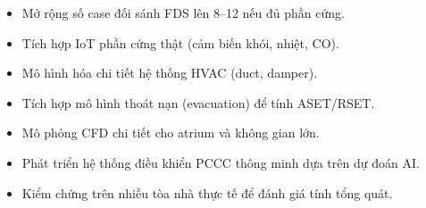 \begin{itemize}
  \item Mở rộng số case đối sánh FDS lên 8--12 nếu đủ phần cứng.
  \item Tích hợp IoT phần cứng thật (cảm biến khói, nhiệt, CO).
  \item Mô hình hóa chi tiết hệ thống HVAC (duct, damper).
  \item Tích hợp mô hình thoát nạn (evacuation) để tính ASET/RSET.
  \item Mô phỏng CFD chi tiết cho atrium và không gian lớn.
  \item Phát triển hệ thống điều khiển PCCC thông minh dựa trên dự đoán AI.
  \item Kiểm chứng trên nhiều tòa nhà thực tế để đánh giá tính tổng quát.
\end{itemize}
